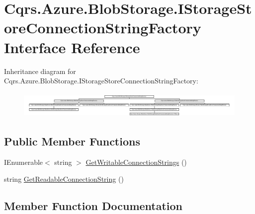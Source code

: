 \hypertarget{interfaceCqrs_1_1Azure_1_1BlobStorage_1_1IStorageStoreConnectionStringFactory}{}\section{Cqrs.\+Azure.\+Blob\+Storage.\+I\+Storage\+Store\+Connection\+String\+Factory Interface Reference}
\label{interfaceCqrs_1_1Azure_1_1BlobStorage_1_1IStorageStoreConnectionStringFactory}
Inheritance diagram for Cqrs.\+Azure.\+Blob\+Storage.\+I\+Storage\+Store\+Connection\+String\+Factory\+:\begin{figure}[H]
\begin{center}
\leavevmode
\includegraphics[height=1.318267cm]{interfaceCqrs_1_1Azure_1_1BlobStorage_1_1IStorageStoreConnectionStringFactory}
\end{center}
\end{figure}
\subsection*{Public Member Functions}
\begin{DoxyCompactItemize}
\item 
I\+Enumerable$<$ string $>$ \hyperlink{interfaceCqrs_1_1Azure_1_1BlobStorage_1_1IStorageStoreConnectionStringFactory_a26ecfd0805fe3d525e9fa419330bd140}{Get\+Writable\+Connection\+Strings} ()
\item 
string \hyperlink{interfaceCqrs_1_1Azure_1_1BlobStorage_1_1IStorageStoreConnectionStringFactory_a0ed836289e048767f753630bbcc98d5d}{Get\+Readable\+Connection\+String} ()
\end{DoxyCompactItemize}


\subsection{Member Function Documentation}
\mbox{\label{interfaceCqrs_1_1Azure_1_1BlobStorage_1_1IStorageStoreConnectionStringFactory_a0ed836289e048767f753630bbcc98d5d}} 
